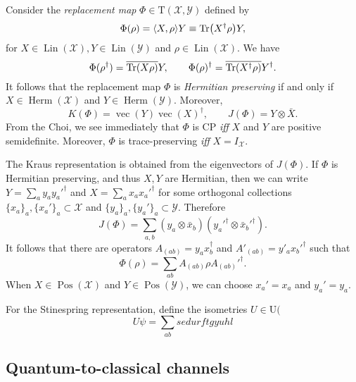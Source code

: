 \documentclass[12pt]{report}
\newcommand{\on}[1]{\operatorname{#1}}
\newcommand{\calY}{{\mathcal{Y}}}
\newcommand{\calX}{{\mathcal{X}}}
\newcommand{\rmT}{{\mathrm{T}}}
\newcommand{\rmU}{{\mathrm{U}}}
\DeclareMathOperator{\Pos}{Pos}
\DeclareMathOperator{\Herm}{Herm}
\DeclareMathOperator{\Lin}{Lin}
\begin{document}
\begin{example}
	Consider the \emph{replacement map} $\Phi\in\rmT(\calX,\calY)$ defined by
	\begin{equation}
		\Phi(\rho)=\langle X, \rho \rangle Y
		\equiv \Tr(X^\dagger \rho) Y,
	\end{equation}
	for $X\in\Lin(\calX),Y\in\Lin(\calY)$ and $\rho\in\Lin(\calX)$.
	We have
	\begin{equation}
		\Phi(\rho^\dagger) = \overline{\Tr(X\rho)} Y,
		\qquad
		\Phi(\rho)^\dagger = \overline{\Tr(X^\dagger\rho)} Y^\dagger.
	\end{equation}
	It follows that the replacement map $\Phi$ is \emph{Hermitian preserving} if and only if $X\in\Herm(\calX)$ and $Y\in\Herm(\calY)$.
	Moreover,
	\begin{equation}
		K(\Phi) = \on{vec}(Y)\on{vec}(X)^\dagger,
		\qquad
		J(\Phi) = Y\otimes \bar X.
	\end{equation}
	From the Choi, we see immediately that $\Phi$ is CP \emph{iff} $X$ and $Y$ are positive semidefinite.
	Moreover, $\Phi$ is trace-preserving \emph{iff} $X=I_\calX$.

	The Kraus representation is obtained from the eigenvectors of $J(\Phi)$.
	If $\Phi$ is Hermitian preserving, and thus $X,Y$ are Hermitian,
	then we can write
	$Y=\sum_a y_a y_a'^\dagger$ and $X=\sum_a x_a x_a'^\dagger$
	for some orthogonal collections $\{x_a\}_a,\{x_a'\}_a\subset\calX$ and $\{y_a\}_a,\{y_a'\}_a\subset\calY$.
	Therefore
	\begin{equation}
		J(\Phi) = \sum_{a,b} (y_a\otimes \bar x_b)(y_a'^\dagger\otimes\bar x_b'^\dagger).
	\end{equation}
	It follows that there are operators
	$A_{(ab)} = y_a x_b^\dagger$ and
	$A'_{(ab)} = y'_a x_b'^\dagger$ such that
	\begin{equation}
		\Phi(\rho) = \sum_{ab} A_{(ab)} \rho A_{(ab)}'^\dagger.
	\end{equation}
	When $X\in\Pos(\calX)$ and $Y\in\Pos(\calY)$, we can choose $x_a'=x_a$ and $y_a'=y_a$.

	For the Stinespring representation, define the isometries $U\in\rmU($
	\begin{equation}
		U \psi = \sum_{ab} sedurftgyuhl
	\end{equation}
\end{example}


\subsection{Quantum-to-classical channels}
\end{document}
